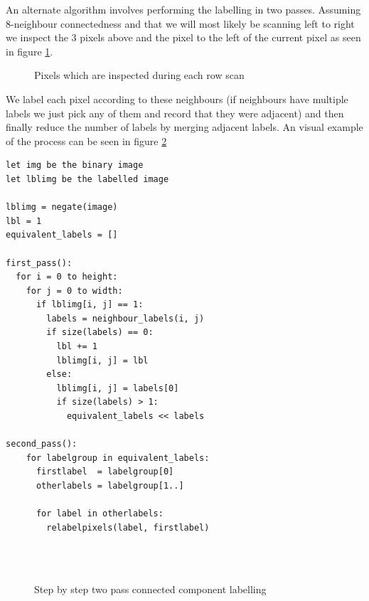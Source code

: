 An alternate algorithm involves performing the labelling in two passes. Assuming 8-neighbour connectedness and that we will most likely be scanning left to right we inspect the 3 pixels above and the pixel to the left of the current pixel as seen in figure \ref{fig:scan-neighbours}.

\begin{figure}[h!]
  \centering
  
  \caption{Pixels which are inspected during each row scan}
  \label{fig:scan-neighbours}
\end{figure}

We label each pixel according to these neighbours (if neighbours have multiple labels we just pick any of them and record that they were adjacent) and then finally reduce the number of labels by merging adjacent labels. An visual example of the process can be seen in figure \ref{fig:ccl-two-pass}

\begin{lstlisting}[caption=Iterative Two-Pass Connected Component Labelling, label=alg:ccl-iterative]
let img be the binary image
let lblimg be the labelled image

lblimg = negate(image)
lbl = 1
equivalent_labels = []

first_pass():
  for i = 0 to height:
    for j = 0 to width:
      if lblimg[i, j] == 1:
        labels = neighbour_labels(i, j)
        if size(labels) == 0:
          lbl += 1
          lblimg[i, j] = lbl
        else:
          lblimg[i, j] = labels[0]
          if size(labels) > 1:
            equivalent_labels << labels

second_pass():
    for labelgroup in equivalent_labels:
      firstlabel  = labelgroup[0]
      otherlabels = labelgroup[1..]

      for label in otherlabels:
        relabelpixels(label, firstlabel)
\end{lstlisting}

\begin{figure}[h!]
  \centering

  \\
  \quad
  \quad
  \\

  \caption{Step by step two pass connected component labelling}
  \label{fig:ccl-two-pass}
\end{figure}


